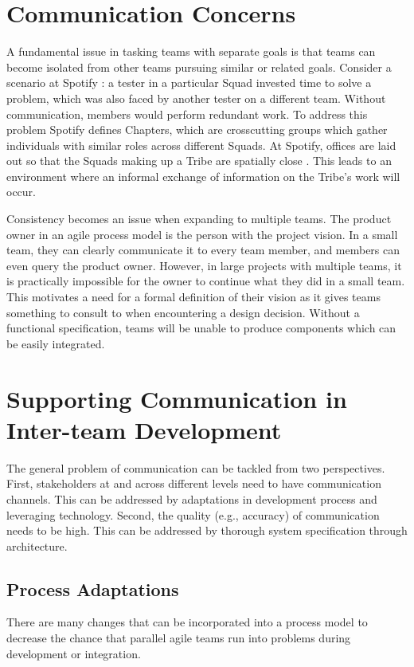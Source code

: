 ﻿\section{Communication Concerns}\label{sec:spt_ex} 
A fundamental issue in tasking teams with separate goals is that teams can become isolated from other teams pursuing similar or related goals.
Consider a scenario at Spotify \cite{kniberg12}: a tester in a particular Squad invested time to solve a problem, which was also faced by another tester on a different team. Without communication, members would perform redundant work.
To address this problem Spotify defines Chapters, which are crosscutting groups which gather individuals with similar roles across different Squads. 
At Spotify, offices are laid out so that the Squads making up a Tribe are spatially close \cite{kniberg12}.
This leads to an environment where an informal exchange of information on the Tribe's work will occur.

Consistency becomes an issue when expanding to multiple teams.
The product owner in an agile process model is the person with the project vision.
In a small team, they can clearly communicate it to every team member, and
members can even query the product owner.
However, in large projects with multiple teams, it is practically impossible for the owner to continue what they did in a small team.
This motivates a need for a formal definition of their vision as it gives teams something to consult to when encountering a design decision.
Without a functional specification, teams will be unable to produce components which can be easily integrated.

\section{Supporting Communication in Inter-team Development}
\label{sec:prop_appro} 
The general problem of communication can be tackled from two perspectives.
First, stakeholders at and across different levels need to have communication channels.
This can be addressed by adaptations in development process and leveraging technology.
Second, the quality (e.g., accuracy) of communication needs to be high.
This can be addressed by thorough system specification through architecture.

\subsection{Process Adaptations} 
\label{sec:proc_impv}
	There are many changes \cite{collabAcrossAgile_article} that can be incorporated into a process model to decrease the chance that parallel agile teams run into problems during development or integration.


